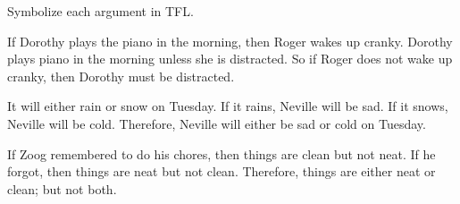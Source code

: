 %
%

\problempart
Symbolize each argument in TFL.
\begin{earg}
\item If Dorothy plays the piano in the morning, then Roger wakes up cranky. Dorothy plays piano in the morning unless she is distracted. So if Roger does not wake up cranky, then Dorothy must be distracted.
\item It will either rain or snow on Tuesday. If it rains, Neville will be sad. If it snows, Neville will be cold. Therefore, Neville will either be sad or cold on Tuesday.
\item If Zoog remembered to do his chores, then things are clean but not neat. If he forgot, then things are neat but not clean. Therefore, things are either neat or clean; but not both.
\end{earg}





